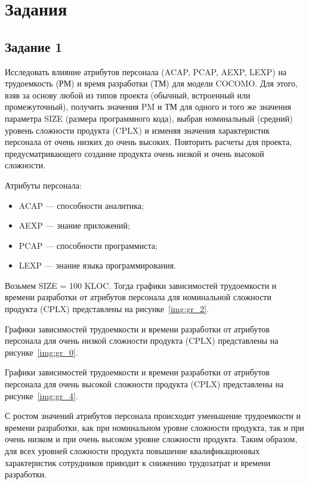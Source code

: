 \chapter{Задания}

\section{Задание 1}

Исследовать влияние атрибутов персонала (ACAP, PCAP, AEXP, LEXP) на трудоемкость (РМ) и время разработки (ТМ) для модели
COCOMO. Для этого, взяв за основу любой из типов проекта (обычный, встроенный или промежуточный), получить значения PM и 
ТМ для одного и того же значения параметра SIZE (размера программного кода), выбрав номинальный (средний) уровень 
сложности продукта (CPLX) и изменяя значения характеристик 
персонала от очень низких до очень высоких.  Повторить расчеты для 
проекта, предусматривающего создание продукта очень низкой и очень 
высокой сложности.

Атрибуты персонала:
\begin{itemize}[label = ---]
	\item ACAP --- способности аналитика;
	\item AEXP --- знание приложений;
	\item PCAP --- способности программиста;
	\item LEXP --- знание языка программирования.
\end{itemize}

Возьмем SIZE = 100 KLOC. Тогда графики зависимостей трудоемкости и времени разработки от атрибутов персонала 
для номинальной сложности продукта (CPLX) представлены на рисунке~\ref{img:gr_2}.

Графики зависимостей трудоемкости и времени разработки от атрибутов персонала 
для очень низкой сложности продукта (CPLX) представлены на рисунке~\ref{img:gr_0}.

Графики зависимостей трудоемкости и времени разработки от атрибутов персонала 
для очень высокой сложности продукта (CPLX) представлены на рисунке~\ref{img:gr_4}.

С ростом значений атрибутов персонала происходит уменьшение трудоемкости и времени разработки, как при номинальном уровне сложности продукта, 
так и при очень низком и при очень высоком уровне сложности продукта. Таким образом, для всех уровней сложности продукта 
повышение квалификационных характеристик сотрудников приводит к снижению трудозатрат и времени разработки. 

